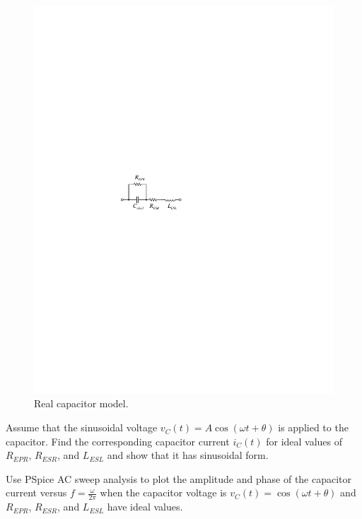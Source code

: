 \documentclass[11pt]{article}
\begin{document}
\begin{question}


    \begin{figure}[H]
        \centering
        \includegraphics[scale=1.5,angle=0]{Fig/cir4.pdf}
        \caption{Real capacitor model.} \label{fig:cir4}
    \end{figure}

    \begin{subquestion}{Assume that the sinusoidal voltage $v_C(t)=A\cos(\omega t+\theta)$ is applied to the capacitor. Find the corresponding capacitor current $i_C(t)$ for ideal values of $R_{EPR}$, $R_{ESR}$, and $L_{ESL}$ and show that it has sinusoidal form.}
        \answer{}
    \end{subquestion}

    \begin{subquestion}{Use PSpice AC sweep analysis to plot the amplitude and phase of the capacitor current versus $f=\frac{\omega}{2\pi}$ when the capacitor voltage is $v_C(t)=\cos(\omega t+\theta)$ and $R_{EPR}$, $R_{ESR}$, and $L_{ESL}$ have ideal values.}
        \answer{}
    \end{subquestion}


\end{question}
\end{document}
